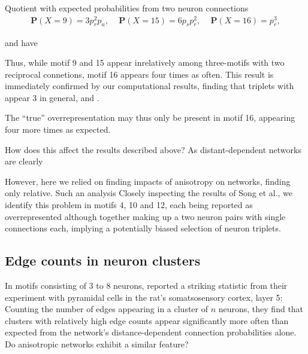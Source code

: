 Quotient with expected probabilities from two neuron connections 
\begin{align*}
      \mathbf{P}(X=9)    =   3 p_r^2 p_u, \quad\,       \mathbf{P}(X=15)   =
      6 p_s p_r^2, \quad\, \mathbf{P}(X=16)   =   p_r^3,
\end{align*}

and have 


Thus, while motif 9 and 15 appear inrelatively among three-motifs with
two reciprocal connetions, motif 16 appears four times as often. This
result is immediately confirmed by our computational results, finding
that triplets with appear 3 in general, and .


The \enquote{true} overrepresentation may thus only be present in
motif 16, appearing four more times as expected. 


 How does this affect the results described
above? As distant-dependent networks are clearly 

However, here we relied on finding impacts of anisotropy on networks,
finding only relative. Such an analysis Closely inspecting the results
of Song et al., we identify this problem in motifs 4, 10 and 12, each
being reported as overrepresented although together making up a two
neuron pairs with single connections each, implying a potentially
biased selection of neuron triplets.








\subsection*{Edge counts in neuron clusters}

In motifs consisting of 3 to 8 neurons, \textcite{Perin2011} reported
a striking statistic from their experiment with pyramidal cells in the
rat's somatsosensory cortex, layer 5: Counting the number of edges
appearing in a cluster of $n$ neurons, they find that clusters with
relatively high edge counts appear significantly more often than
expected from the network's distance-dependent connection
probabilities alone. Do anisotropic networks exhibit a similar
feature?


